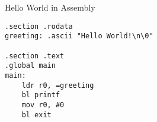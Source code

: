 

\begin{frame}[fragile]{Hello World in Assembly}

    \begin{verbatim}
.section .rodata
greeting: .ascii "Hello World!\n\0"

.section .text
.global main
main:
    ldr r0, =greeting
    bl printf
    mov r0, #0
    bl exit
\end{verbatim}

\end{frame}

